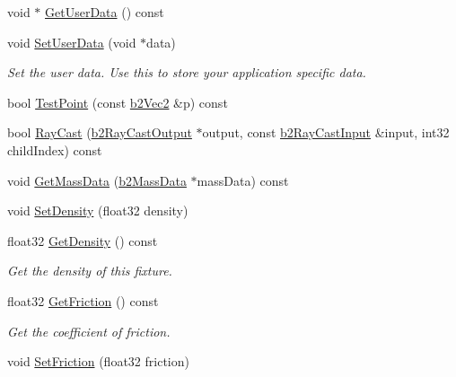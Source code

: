 \begin{DoxyCompactItemize}
\item 
void $\ast$ \hyperlink{classb2Fixture_a812561653393617bd951c566802ddc99}{Get\+User\+Data} () const
\item 
\mbox{\label{classb2Fixture_a3db7f89ef4493247d922fe3d96351ad9}} 
void \hyperlink{classb2Fixture_a3db7f89ef4493247d922fe3d96351ad9}{Set\+User\+Data} (void $\ast$data)
\begin{DoxyCompactList}\small\item\em Set the user data. Use this to store your application specific data. \end{DoxyCompactList}\item 
bool \hyperlink{classb2Fixture_aa56d3ca04a5d0478c6477876cd480cc6}{Test\+Point} (const \hyperlink{structb2Vec2}{b2\+Vec2} \&p) const
\item 
bool \hyperlink{classb2Fixture_aaaafd69aa3e1a922acc4b9d7fb49170a}{Ray\+Cast} (\hyperlink{structb2RayCastOutput}{b2\+Ray\+Cast\+Output} $\ast$output, const \hyperlink{structb2RayCastInput}{b2\+Ray\+Cast\+Input} \&input, int32 child\+Index) const
\item 
void \hyperlink{classb2Fixture_a4532a12e848c5ceb5a3b94cf45b7cbad}{Get\+Mass\+Data} (\hyperlink{structb2MassData}{b2\+Mass\+Data} $\ast$mass\+Data) const
\item 
void \hyperlink{classb2Fixture_ad4e1d9323103975c8931d022b952d04a}{Set\+Density} (float32 density)
\item 
\mbox{\label{classb2Fixture_a228861bb1b1d7b2fb6e091401340784e}} 
float32 \hyperlink{classb2Fixture_a228861bb1b1d7b2fb6e091401340784e}{Get\+Density} () const
\begin{DoxyCompactList}\small\item\em Get the density of this fixture. \end{DoxyCompactList}\item 
\mbox{\label{classb2Fixture_a2853d799f299cb1ce76e48261d42a5ad}} 
float32 \hyperlink{classb2Fixture_a2853d799f299cb1ce76e48261d42a5ad}{Get\+Friction} () const
\begin{DoxyCompactList}\small\item\em Get the coefficient of friction. \end{DoxyCompactList}\item 
void \hyperlink{classb2Fixture_ad0cd91eef5858c8ef1d6b62cc2a34ea2}{Set\+Friction} (float32 friction)
\item 

\end{DoxyCompactItemize}
